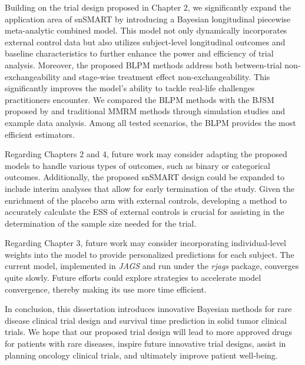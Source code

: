 Building on the trial design proposed in Chapter 2, we significantly expand the application area of \ac{snSMART} by introducing a Bayesian longitudinal piecewise meta-analytic combined model. This model not only dynamically incorporates external control data but also utilizes subject-level longitudinal outcomes and baseline characteristics to further enhance the power and efficiency of trial analysis. Moreover, the proposed \ac{BLPM} methods address both between-trial non-exchangeability and stage-wise treatment effect non-exchangeability. This significantly improves the model's ability to tackle real-life challenges practitioners encounter. We compared the \ac{BLPM} methods with the \ac{BJSM} proposed by \cite{fang2023comparing} and traditional MMRM methods through simulation studies and example data analysis. Among all tested scenarios, the \ac{BLPM} provides the most efficient estimators.

Regarding Chapters 2 and 4, future work may consider adapting the proposed models to handle various types of outcomes, such as binary or categorical outcomes. Additionally, the proposed \ac{snSMART} design could be expanded to include interim analyses that allow for early termination of the study. Given the enrichment of the placebo arm with external controls, developing a method to accurately calculate the \ac{ESS} of external controls is crucial for assisting in the determination of the sample size needed for the trial.

Regarding Chapter 3, future work may consider incorporating individual-level weights into the model to provide personalized predictions for each subject. The current model, implemented in \textit{JAGS} and run under the \textit{rjags} package, converges quite slowly. Future efforts could explore strategies to accelerate model convergence, thereby making its use more time efficient.

In conclusion, this dissertation introduces innovative Bayesian methods for rare disease clinical trial design and survival time prediction in solid tumor clinical trials. We hope that our proposed trial design will lead to more approved drugs for patients with rare diseases, inspire future innovative trial designs, assist in planning oncology clinical trials, and ultimately improve patient well-being.



